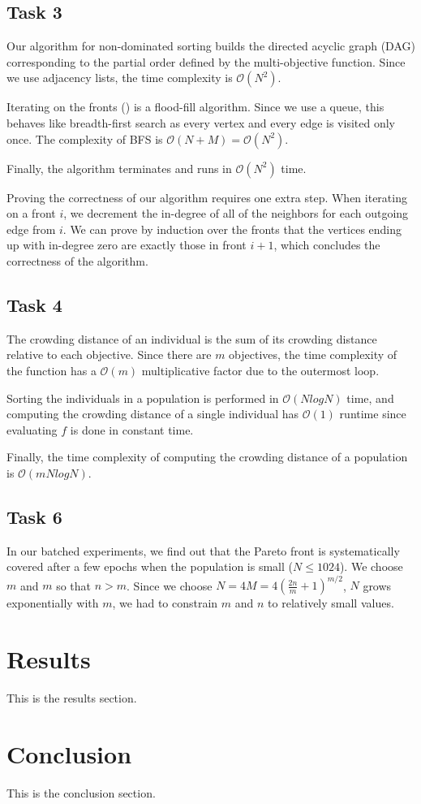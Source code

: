 \documentclass[english]{article}
\begin{document}
\subsection{Task 3}

Our algorithm for non-dominated sorting builds the directed acyclic graph (DAG) corresponding to the partial order defined by the multi-objective function. Since we use adjacency lists, the time complexity is $\mathcal{O}(N^2)$.

Iterating on the fronts () is a flood-fill algorithm. Since we use a queue, this behaves like breadth-first search as every vertex and every edge is visited only once. The complexity of BFS is $\mathcal{O}(N + M) = \mathcal{O}(N^2)$.

Finally, the algorithm terminates and runs in $\mathcal{O}(N^2)$ time.

Proving the correctness of our algorithm requires one extra step. When iterating on a front $i$, we decrement the in-degree of all of the neighbors for each outgoing edge from $i$. We can prove by induction over the fronts that the vertices ending up with in-degree zero are exactly those in front $i+1$, which concludes the correctness of the algorithm.

\subsection{Task 4}

The crowding distance of an individual is the sum of its crowding distance relative to each objective. Since there are $m$ objectives, the time complexity of the function has a $\mathcal{O}(m)$ multiplicative factor due to the outermost loop.

Sorting the individuals in a population is performed in $\mathcal{O}(N log N)$ time, and computing the crowding distance of a single individual has $\mathcal{O}(1)$ runtime since evaluating $f$ is done in constant time.

Finally, the time complexity of computing the crowding distance of a population is $\mathcal{O}(m N log N)$.

\subsection{Task 6}

In our batched experiments, we find out that the Pareto front is systematically covered after a few epochs when the population is small ($N \le 1024$). We choose $m$ and $m$ so that $n > m$. Since we choose $N = 4 M = 4 \left(\frac{2 n}{m} + 1 \right)^{m / 2}$, $N$ grows exponentially with $m$, we had to constrain $m$ and $n$ to relatively small values.

\section{Results}
This is the results section.

\section{Conclusion}
This is the conclusion section.

\end{document}

